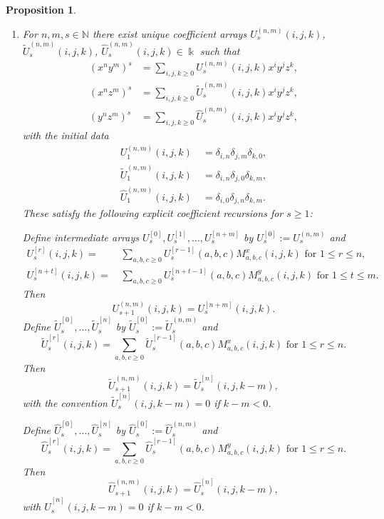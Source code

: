 \documentclass{amsart}
\newtheorem{proposition}[theorem]{Proposition}
\theoremstyle{definition}
\theoremstyle{remark}
\numberwithin{equation}{section}
\begin{document}
\begin{proposition}
\begin{enumerate}
\item [\rm (2)] For $n,m,s\in\mathbb N$ there exist unique coefficient arrays
$U^{(n,m)}_{s}(i,j,k)$, $\widetilde U^{(n,m)}_{s}(i,j,k)$, $\widehat U^{(n,m)}_{s}(i,j,k)\in\Bbbk$ such that
\begin{align}
(x^n y^m)^s&=\sum_{i,j,k\ge 0}U^{(n,m)}_{s}(i,j,k)x^iy^jz^k,\label{Uxydefcase5i}\\
(x^n z^m)^s&=\sum_{i,j,k\ge 0}\widetilde U^{(n,m)}_{s}(i,j,k)x^iy^jz^k,\label{Uxzdefcase5i}\\
(y^n z^m)^s&=\sum_{i,j,k\ge 0}\widehat U^{(n,m)}_{s}(i,j,k)x^iy^jz^k,\label{Uyzdefcase5i}
\end{align}
with the initial data
\begin{align*}
U^{(n,m)}_{1}(i,j,k) &\ =\delta_{i,n}\delta_{j,m}\delta_{k,0},\\
\widetilde U^{(n,m)}_{1}(i,j,k) &\ =\delta_{i,n}\delta_{j,0}\delta_{k,m},\\
\widehat U^{(n,m)}_{1}(i,j,k)&\ =\delta_{i,0}\delta_{j,n}\delta_{k,m}.
\end{align*}
These satisfy the following explicit coefficient recursions for $s\ge 1$:

Define intermediate arrays $U^{[0]}_{s},U^{[1]}_{s},\dots,U^{[n+m]}_{s}$ by $U^{[0]}_{s}:=U^{(n,m)}_{s}$ and
\begin{align*}
    U^{[r]}_{s}(i,j,k) = &\, \sum_{a,b,c\ge 0}U^{[r-1]}_{s}(a,b,c)M^x_{a,b,c}(i,j,k)\text{ for } 1\le r\le n, \\
    U^{[n+t]}_{s}(i,j,k) = &\, \sum_{a,b,c\ge 0}U^{[n+t-1]}_{s}(a,b,c)M^y_{a,b,c}(i,j,k)\text{ for } 1\le t\le m.
\end{align*}
Then
\begin{equation}\label{Uxyreccase5i}
U^{(n,m)}_{s+1}(i,j,k)=U^{[n+m]}_{s}(i,j,k).
\end{equation}
Define $\widetilde U^{[0]}_{s},\dots,\widetilde U^{[n]}_{s}$ by $\widetilde U^{[0]}_{s}:=\widetilde U^{(n,m)}_{s}$ and
\[
\widetilde U^{[r]}_{s}(i,j,k)=\sum_{a,b,c\ge 0}\widetilde U^{[r-1]}_{s}(a,b,c)M^x_{a,b,c}(i,j,k)\text{ for } 1\le r\le n.
\]
Then
\begin{equation}\label{Uxzreccase5i}
\widetilde U^{(n,m)}_{s+1}(i,j,k)=\widetilde U^{[n]}_{s}(i,j,k-m),
\end{equation}
with the convention $\widetilde U^{[n]}_{s}(i,j,k-m)=0$ if $k-m<0$.

Define $\widehat U^{[0]}_{s},\dots,\widehat U^{[n]}_{s}$ by $\widehat U^{[0]}_{s}:=\widehat U^{(n,m)}_{s}$ and
\[
\widehat U^{[r]}_{s}(i,j,k)=\sum_{a,b,c\ge 0}\widehat U^{[r-1]}_{s}(a,b,c)M^y_{a,b,c}(i,j,k)\text{ for } 1\le r\le n.
\]
Then
\begin{equation}\label{Uyzreccase5i}
\widehat U^{(n,m)}_{s+1}(i,j,k)=\widehat U^{[n]}_{s}(i,j,k-m),
\end{equation}
with $\widehat U^{[n]}_{s}(i,j,k-m)=0$ if $k-m<0$.


\end{enumerate}
\end{proposition}
\end{document}
